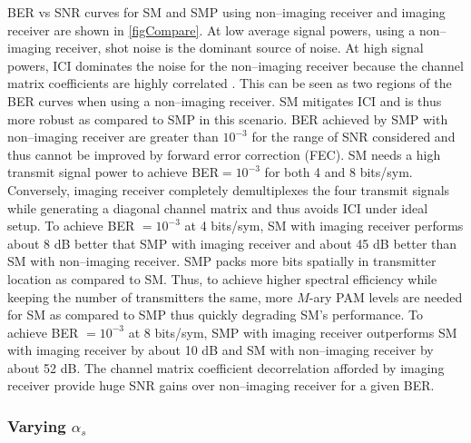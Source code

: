 BER vs SNR curves for SM and SMP using non--imaging receiver and imaging receiver are shown in \figurename{ \ref{figCompare}}. At low average signal powers, using a non--imaging receiver, shot noise is the dominant source of noise. At high signal powers, ICI dominates the noise for the non--imaging receiver because the channel matrix coefficients are highly correlated \cite{zen09a}. This can be seen as two regions of the BER curves when using a non--imaging receiver. SM mitigates ICI and is thus more robust as compared to SMP in this scenario. BER achieved by SMP with non--imaging receiver are greater than $10^{-3}$ for the range of SNR considered and thus cannot be improved by forward error correction (FEC). SM needs a high transmit signal power to achieve BER$=10^{-3}$ for both 4 and 8 bits/sym. Conversely, imaging receiver completely demultiplexes the four transmit signals while generating a diagonal channel matrix and thus avoids ICI under ideal setup. To achieve BER $=10^{-3}$ at 4 bits/sym, SM with imaging receiver performs about 8 dB better that SMP with imaging receiver and about 45 dB better than SM with non--imaging receiver. SMP packs more bits spatially in transmitter location as compared to SM. Thus, to achieve higher spectral efficiency while keeping the number of transmitters the same, more $M$-ary PAM levels are needed for SM as compared to SMP thus quickly degrading SM's performance. To achieve BER $=10^{-3}$ at 8 bits/sym, SMP with imaging receiver outperforms SM with imaging receiver by about 10 dB and SM with non--imaging receiver by about 52 dB. The channel matrix coefficient decorrelation afforded by imaging receiver provide huge SNR gains over non--imaging receiver for a given BER.


\subsubsection{Varying $\alpha_{s}$}
\label{subsec:osmResultsAlpha}


